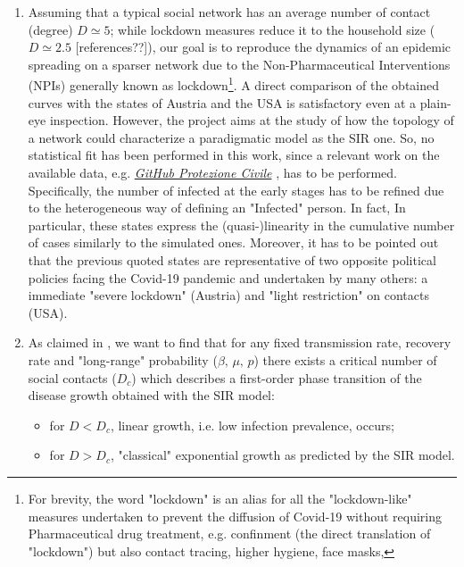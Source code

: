 \documentclass[a4paper,11pt,twoside]{report} %
\begin{document}
\begin{enumerate}
	\item Assuming that a typical social network has an average number of contact (degree) $ D \simeq 5$; while lockdown measures reduce it to the household size ($D\simeq2.5$ [references??]), our goal is to reproduce the dynamics of an epidemic spreading on a sparser network due to the Non-Pharmaceutical Interventions (NPIs) generally known as lockdown\footnote{For brevity, the word "lockdown" is an alias for all the "lockdown-like" measures undertaken to prevent the diffusion of Covid-19 without requiring Pharmaceutical drug treatment, e.g. confinment (the direct translation of "lockdown") but also contact tracing, higher hygiene, face masks,}. A direct comparison of the obtained curves with the states of Austria and the USA \cite{Thurner::NetBasedExpl} is satisfactory even at a plain-eye inspection. However, the project aims at the study of how the topology of a network could characterize a paradigmatic model as the SIR one. 
    So, no statistical fit has been performed in this work, since a relevant work on the available data, e.g.
    \href{https://github.com/pcm-dpc/COVID-19}{\textit{GitHub Protezione Civile}} , has to be performed.
    Specifically, the number of infected at the early stages has to be refined due to the heterogeneous way of defining an "Infected" person. In fact, 
    In particular, these states express the (quasi-)linearity in the cumulative number of cases similarly to the simulated ones.
    Moreover, it has to be pointed out that the previous quoted states are representative of two opposite political policies facing the Covid-19 pandemic and undertaken by many others: a immediate "severe lockdown" (Austria) and "light restriction" on contacts (USA).
	\item As claimed in \cite{Thurner::NetBasedExpl}, we want to find that for any fixed transmission rate, recovery rate and "long-range" probability ($\beta, \, \mu, \, p$) there exists a critical number of social contacts ($D_c$) which describes a first-order phase transition of the disease growth obtained with the SIR model:
	\begin{itemize}
		\item for $D<D_c$, linear growth, i.e. low infection prevalence, occurs;
		\item for $D>D_c$, "classical" exponential growth as predicted by the SIR model.
	\end{itemize}


\end{enumerate}
\end{document}
